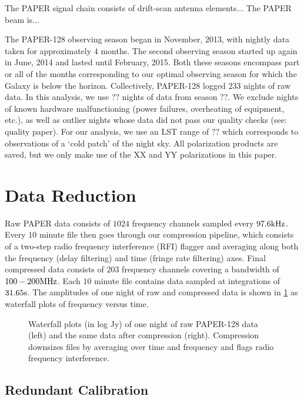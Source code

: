\documentclass[preprint2,numberedappendix,tighten,twocolappendix]{aastex6}  %
\begin{document}
The PAPER signal chain consists of drift-scan antenna elements...
The PAPER beam is...

The PAPER-128 observing season began in November, 2013, with nightly data taken for approximately $4$ months. The second observing season started up again in June, 2014 and lasted until February, 2015. Both these seasons encompass part or all of the months corresponding to our optimal observing season for which the Galaxy is below the horizon. Collectively, PAPER-128 logged $233$ nights of raw data. In this analysis, we use $??$ nights of data from season $??$. We exclude nights of known hardware malfunctioning (power failures, overheating of equipment, etc.), as well as outlier nights whose data did not pass our quality checks (see: quality paper). For our analysis, we use an LST range of $??$ which corresponds to observations of a `cold patch' of the night sky. All polarization products are saved, but we only make use of the XX and YY polarizations in this paper.

\section{Data Reduction}
\label{sec:Cal}

Raw PAPER data consists of $1024$ frequency channels sampled every $97.6 {\rm kHz}$. Every $10$ minute file then goes through our compression pipeline, which consists of a two-step radio frequency interference (RFI) flagger and averaging along both the frequency (delay filtering) and time (fringe rate filtering) axes. Final compressed data consists of $203$ frequency channels covering a bandwidth of $100-200 {\rm MHz}$. Each $10$ minute file contains data sampled at integrations of $31.65 {\rm s}$. The amplitudes of one night of raw and compressed data is shown in \ref{fig:raw} as waterfall plots of frequency versus time. 

\begin{figure}[!]
	\centering
	\caption{Waterfall plots (in log Jy) of one night of raw PAPER-128 data (left) and the same data after compression (right). Compression downsizes files by averaging over time and frequency and flags radio frequency interference.}
	\label{fig:raw}
\end{figure}

\subsection{Redundant Calibration}
\end{document}
